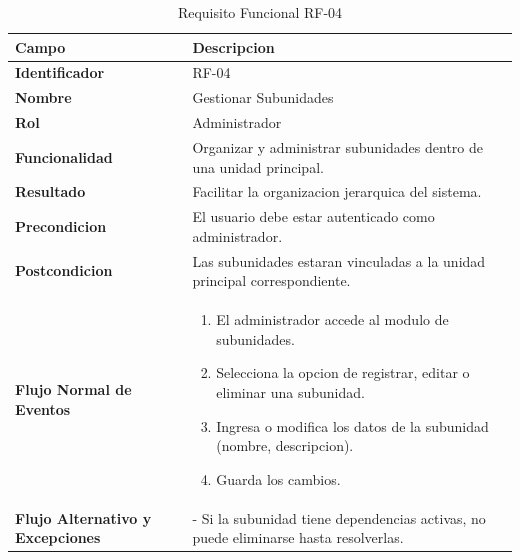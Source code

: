 \begin{table}[htb!]
\centering
\caption{Requisito Funcional RF-04}
\begin{tabular}{|p{3cm}|p{12cm}|}
\hline
\textbf{Campo} & \textbf{Descripcion} \\ \hline
\textbf{Identificador} & RF-04 \\ \hline
\textbf{Nombre} & Gestionar Subunidades \\ \hline
\textbf{Rol} & Administrador \\ \hline
\textbf{Funcionalidad} & Organizar y administrar subunidades dentro de una unidad principal. \\ \hline
\textbf{Resultado} & Facilitar la organizacion jerarquica del sistema. \\ \hline
\textbf{Precondicion} & El usuario debe estar autenticado como administrador. \\ \hline
\textbf{Postcondicion} & Las subunidades estaran vinculadas a la unidad principal correspondiente. \\ \hline
\textbf{Flujo Normal de Eventos} & 
\begin{enumerate}
    \item El administrador accede al modulo de subunidades. 
    \item Selecciona la opcion de registrar, editar o eliminar una subunidad. 
    \item Ingresa o modifica los datos de la subunidad (nombre, descripcion). 
    \item Guarda los cambios. 
    
\end{enumerate}
\\ \hline
\textbf{Flujo Alternativo y Excepciones} & 
- Si la subunidad tiene dependencias activas, no puede eliminarse hasta resolverlas. \\ \hline
\end{tabular}
\end{table}
\FloatBarrier

